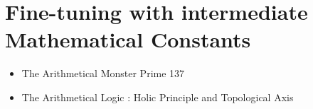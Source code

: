 \chapter{Fine-tuning with intermediate Mathematical Constants}

\begin{itemize}
\item The Arithmetical Monster Prime 137
\item The Arithmetical Logic : Holic Principle and Topological Axis
\end{itemize}

